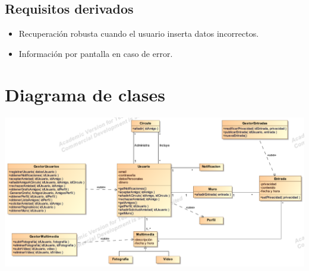 \documentclass[12pt, a4paper, titlepage]{article}
\begin{document}
\subsection{Requisitos derivados}

\begin{itemize}
	\item Recuperación robusta cuando el usuario inserta datos incorrectos.
	\item Información por pantalla en caso de error.
\end{itemize}

\newpage
\section{Diagrama de clases}\label{sec:Diagrama}

	

\begin{center}
	\includegraphics[scale=0.8,angle=90]{Imagenes/DiagramaClases}
\end{center}
\end{document}
